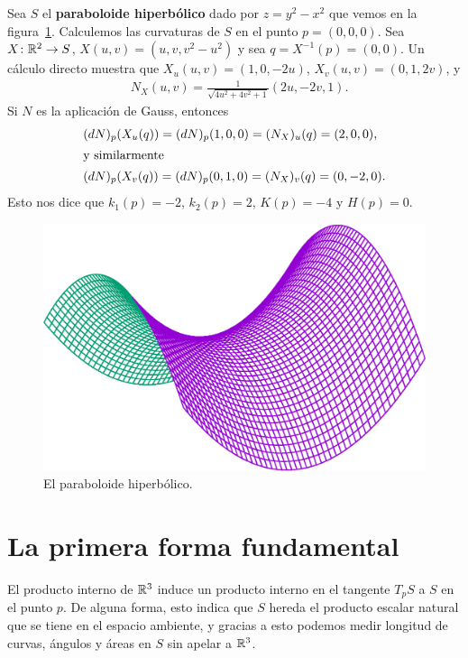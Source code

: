 \begin{example}
	\label{exa:paraboloide_hiperbolico}
	Sea $S$ el \textbf{paraboloide hiperbólico} dado por $z=y^2-x^2$ que vemos en la
	figura~\ref{fig:hiperboloide}.  Calculemos las curvaturas de $S$ en el
	punto $p=(0,0,0)$. Sea $X\colon\mathbb{R}^2\to S$, 
	$X(u,v)=(u,v,v^2-u^2)$ y sea $q=X^{-1}(p)=(0,0)$.  Un cálculo directo
	muestra que $X_u(u,v)=(1,0,-2u)$, $X_v(u,v)=(0,1,2v)$, y 
	\begin{align*}
		&N_X(u,v)=\frac{1}{\sqrt{4u^2+4v^2+1}}(2u,-2v,1).
	\end{align*}
	Si $N$ es la aplicación de Gauss, entonces
	\begin{align*}
		&(dN)_p(X_u(q))=(dN)_p(1,0,0)=(N_X)_u(q)=(2,0,0),\\
	\shortintertext{y similarmente}
		&(dN)_p(X_v(q))=(dN)_p(0,1,0)=(N_X)_v(q)=(0,-2,0).
	\end{align*}
	Esto nos dice que $k_1(p)=-2$,
	$k_2(p)=2$, $K(p)=-4$ y $H(p)=0$. 
	\begin{figure}[h]
		\centering
    	\includegraphics[scale=0.3]{eps/hyperbolic}
		\caption{El paraboloide hiperbólico.}
		\label{fig:hiperboloide}
	\end{figure}
\end{example}

\chapter{La primera forma fundamental} 

El producto interno de $\mathbb{R}^3$ induce un producto interno en el tangente $T_pS$
a $S$ en el punto $p$. De alguna forma, esto indica que $S$ hereda el producto
escalar natural que se tiene en el espacio ambiente, y gracias a esto podemos
medir longitud de curvas, ángulos y áreas en $S$ sin apelar a $\mathbb{R}^3$. 

